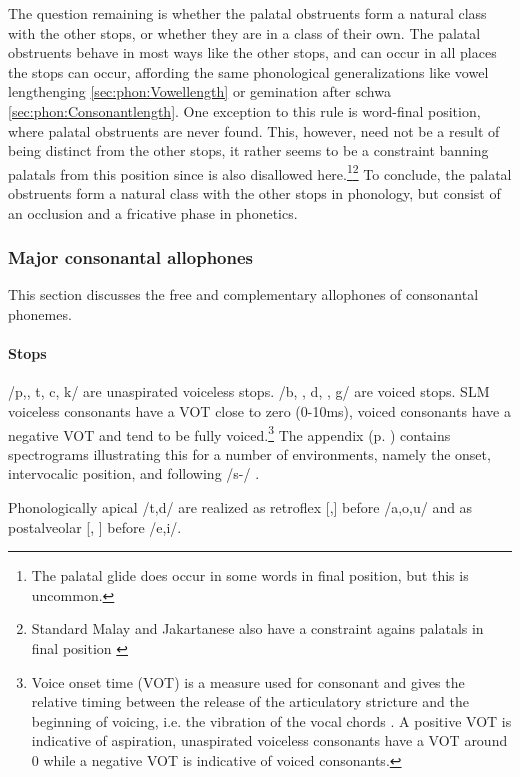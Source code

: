 The question remaining is whether the palatal obstruents form a natural class with the other stops, or whether they are in a class of their own. The palatal obstruents behave in most ways like the other stops, and can occur in all places the stops can occur, affording the same phonological generalizations like vowel lengthenging \ref{sec:phon:Vowellength} or gemination after schwa \ref{sec:phon:Consonantlength}. One exception to this rule is word-final position, where palatal obstruents are never found. This, however, need not be a result of  being distinct from the other stops, it rather seems to be a constraint banning palatals from this position since \ny{} is also disallowed here.\footnote{The palatal glide  does occur in some words in final position, but this is uncommon.}\footnote{Standard Malay and Jakartanese also have a constraint agains palatals in final position \citep[12,32]{Adelaar1985}}
To conclude, the palatal obstruents form a natural class with the other stops in phonology, but consist of an occlusion and a fricative phase in phonetics.

\subsubsection{Major consonantal allophones}\label{sec:phon:Majorconsonantalallophones}
This section discusses the free and complementary  allophones of consonantal phonemes.

\paragraph{Stops}
/p,\dentt, t, c, k/  are unaspirated voiceless stops. /b, \dentd, d, \J, g/ are voiced stops. SLM voiceless consonants have a VOT close to zero (0-10ms), voiced consonants have a negative VOT and tend to be fully voiced.\footnote{
Voice onset time (VOT) is a measure used for consonant and gives the relative timing between the release of the articulatory stricture and the beginning of voicing, i.e. the vibration of the vocal chords \citep[19f]{Ladefoged1975course}. A  positive VOT is indicative of aspiration, unaspirated voiceless consonants have a VOT around 0 while a negative VOT is indicative of voiced consonants.}
The appendix (p. \pageref{sec:VOT}) contains spectrograms illustrating this for a number of environments, namely the onset, intervocalic position, and following /s-/ .\kuckn


Phonologically apical /t,d/ are realized as retroflex [\tz,\dz] before /a,o,u/  and as postalveolar [\postalvt, \postalvd] before /e,i/.

